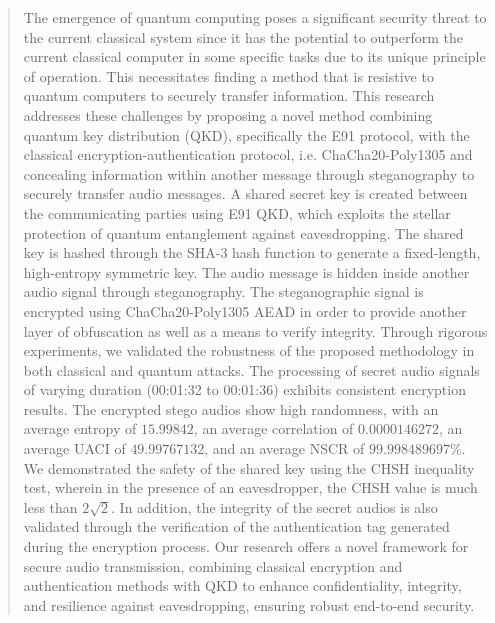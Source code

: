 \documentclass[a4paper]{cas-sc}
\begin{document}


\begin{abstract}
    The emergence of quantum computing poses a significant security threat to the current classical system since it has the potential to outperform the current classical computer in some specific tasks due to its unique principle of operation. This necessitates finding a method that is resistive to quantum computers to securely transfer information. This research addresses these challenges by proposing a novel method combining quantum key distribution (QKD), specifically the E91 protocol, with the classical encryption-authentication protocol, i.e. ChaCha20-Poly1305 and concealing information within another message through steganography to securely transfer audio messages. A shared secret key is created between the communicating parties using E91 QKD, which exploits the stellar protection of quantum entanglement against eavesdropping. The shared key is hashed through the SHA-3 hash function to generate a fixed-length, high-entropy symmetric key. The audio message is hidden inside another audio signal through steganography. The steganographic signal is encrypted using ChaCha20-Poly1305 AEAD in order to provide another layer of obfuscation as well as a means to verify integrity. Through rigorous experiments, we validated the robustness of the proposed methodology in both classical and quantum attacks. The processing of secret audio signals of varying duration (00:01:32 to 00:01:36) exhibits consistent encryption results. The encrypted stego audios show high randomness, with an average entropy of $15.99842$, an average correlation of $0.0000146272$, an average UACI of $49.99767132$, and an average NSCR of $99.998489697\%$.  We demonstrated the safety of the shared key using the CHSH inequality test, wherein in the presence of an eavesdropper, the CHSH value is much less than $2\sqrt{2}$. In addition, the integrity of the secret audios is also validated through the verification of the authentication tag generated during the encryption process. Our research offers a novel framework for secure audio transmission, combining classical encryption and authentication methods with QKD to enhance confidentiality, integrity, and resilience against eavesdropping, ensuring robust end-to-end security.


\end{abstract}
\end{document}
